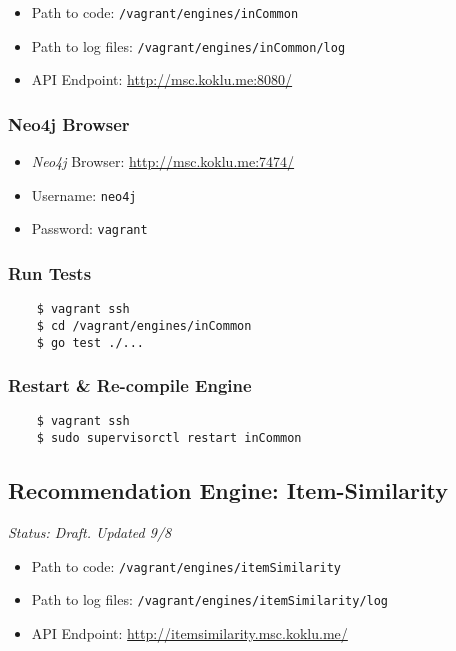 \begin{itemize}
\item Path to code: \texttt{/vagrant/engines/inCommon}
\item Path to log files: \texttt{/vagrant/engines/inCommon/log}
\item API Endpoint: \url{http://msc.koklu.me:8080/}
\end{itemize}

\subsubsection{Neo4j Browser}

\begin{itemize}
\item \emph{Neo4j} Browser: \url{http://msc.koklu.me:7474/}
\item Username: \texttt{neo4j}
\item Password: \texttt{vagrant}
\end{itemize}

\subsubsection{Run Tests}

\begin{verbatim}
    $ vagrant ssh
    $ cd /vagrant/engines/inCommon
    $ go test ./...
\end{verbatim}

\subsubsection{Restart \& Re-compile Engine}

\begin{verbatim}
    $ vagrant ssh
    $ sudo supervisorctl restart inCommon
\end{verbatim}


\subsection{Recommendation Engine: Item-Similarity}

\emph{Status: Draft. Updated 9/8}

\begin{itemize}
\item Path to code: \texttt{/vagrant/engines/itemSimilarity}
\item Path to log files: \texttt{/vagrant/engines/itemSimilarity/log}
\item API Endpoint: \url{http://itemsimilarity.msc.koklu.me/}
\end{itemize}


